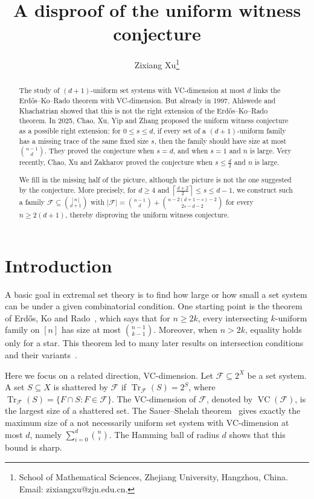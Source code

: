 \documentclass[11pt]{article}
\title{A disproof of the uniform witness conjecture}
\author{
Zixiang Xu\thanks{School of Mathematical Sciences, Zhejiang University, Hangzhou, China. Email: zixiangxu@zju.edu.cn.}
}
\date{}
\theoremstyle{definition}
\newcommand{\cF}{\mathcal{F}}
\newcommand{\VC}{\operatorname{VC}}
\newcommand{\Tr}{\operatorname{Tr}}
\begin{document}
\maketitle

\begin{abstract}
The study of \((d+1)\)-uniform set systems with VC-dimension at most \(d\) links the Erd\H{o}s--Ko--Rado theorem with VC-dimension. But already in 1997, Ahlswede and Khachatrian showed that this is not the right extension of the Erd\H{o}s--Ko--Rado theorem. In 2025, Chao, Xu, Yip and Zhang proposed the uniform witness conjecture as a possible right extension: for \(0\le s\le d\), if every set of a \((d+1)\)-uniform family has a missing trace of the same fixed size \(s\), then the family should have size at most \(\binom{n-1}{d}\). They proved the conjecture when \(s=d\), and when \(s=1\) and \(n\) is large. Very recently, Chao, Xu and Zakharov proved the conjecture when \(s\le \frac{d}{2}\) and \(n\) is large.

We fill in the missing half of the picture, although the picture is not the one suggested by the conjecture. More precisely, for \(d\ge4\) and \(\left\lceil \frac{d+2}{2}\right\rceil\le s\le d-1\), we construct such a family \(\mathcal{F}\subseteq\binom{[n]}{d+1}\) with
\(
|\mathcal{F}|=\binom{n-1}{d}+\binom{n-2(d+1-s)-2}{2s-d-2}
\)
for every \(n\ge2(d+1)\), thereby disproving the uniform witness conjecture.

\end{abstract}

\section{Introduction}

A basic goal in extremal set theory is to find how large or how small a set system can be under a given combinatorial condition. One starting point is the theorem of Erd\H{o}s, Ko and Rado~\cite{1961EKR}, which says that for \(n\ge2k\), every intersecting \(k\)-uniform family on \([n]\) has size at most \(\binom{n-1}{k-1}\). Moreover, when \(n>2k\), equality holds only for a star. This theorem led to many later results on intersection conditions and their variants~\cite{1989Chuan,2017PAMSHan,1967HM,2017HuangZhao,2024PengHuang,1986Pyber}.

Here we focus on a related direction, VC-dimension. Let \(\cF\subseteq 2^X\) be a set system. A set \(S\subseteq X\) is shattered by \(\cF\) if \(\Tr_{\cF}(S)=2^S\), where \(\Tr_{\cF}(S)=\{F\cap S:F\in\cF\}\). The VC-dimension of \(\cF\), denoted by \(\VC(\cF)\), is the largest size of a shattered set. The Sauer--Shelah theorem~\cite{1972JCTASauer,1972PACJMShelah,1971TPAVCVC} gives exactly the maximum size of a not necessarily uniform set system with VC-dimension at most \(d\), namely \(\sum_{i=0}^d\binom{n}{i}\). The Hamming ball of radius \(d\) shows that this bound is sharp.
\end{document}
